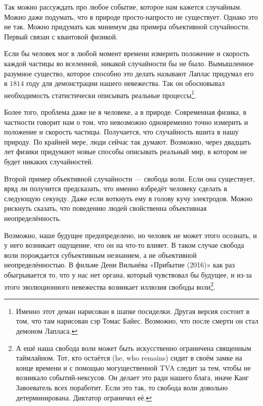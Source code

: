 \documentclass[12pt, a4paper, oneside]{article}
\begin{document}
Так можно рассуждать про любое событие, которое нам кажется случайным. Можно даже подумать, что  в природе просто-напросто не существует. Однако это не так. Можно придумать как минимум два примера объективной случайности. Первый связан с квантовой физикой. 

Если бы человек мог в любой момент времени измерить положение и скорость каждой частицы во вселенной, никакой случайности бы не было. Вымышленное разумное существо, которое способно это делать называют  Лаплас придумал его в $1814$ году для демонстрации нашего невежества. Так он обосновывал необходимость статистически описывать реальные процессы\footnote{Именно этот деман нарисован в шапке посиделки. Другая версия состоит в том, что там нарисован сэр Томас Байес. Возможно, что после смерти он стал демоном Лапласа.}. 

Более того, проблема даже не в человеке, а в природе. Современная физика, в частности  говорит нам о том, что невозможно одновременно точно измерить и положение и скорость частицы. Получается, что случайность вшита в нашу природу. По крайней мере, люди сейчас так думают. Возможно, через двадцать лет физики придумают новые способы описывать реальный мир, в котором не будет никаких случайностей. 

Второй пример объективной случайности --- свобода воли. Если она существует, вряд ли получится предсказать, что именно взбредёт человеку сделать в следующую секунду. Даже если воткнуть ему в голову кучу электродов. Можно рискнуть сказать, что поведению людей свойственна объективная неопределённость.

Возможно, наше будущее предопределено, но человек не может этого осознать, и у него возникает ощущение, что он на что-то влияет. В таком случае свобода воли порождается субъективным незнанием, а не объективной неопределённостью. В фильме Дени Вильнёва «Прибытие (2016)» как раз обыгрывается то, что у нас нет органа, который чувствовал бы будущее, и из-за этого эволюционного невежества возникает иллюзия свободы воли\footnote{А ешё наша свобода воли может быть искусственно ограничена священным таймлайном. Тот, кто остаётся (he, who remains) сидит в своём замке на конце времени и с помощью могущественной TVA следит за тем, чтобы не возникало событий-нексусов. Он делает это ради нашего блага, иначе Канг Завоеватель всех поработит. Если это так, то свобода воли довольно детерминирована. Диктатор ограничил её.}.
\end{document}
